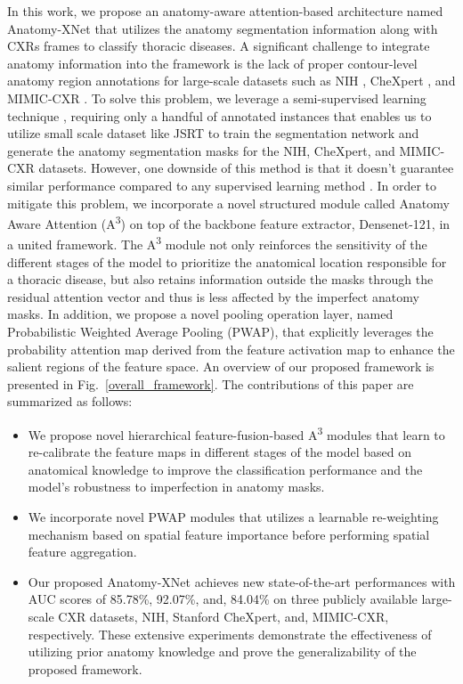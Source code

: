 \documentclass[journal]{IEEEtran}
\begin{document}
In this work, we propose an anatomy-aware attention-based architecture named Anatomy-XNet that utilizes the anatomy segmentation information along with CXRs frames to classify thoracic diseases. A significant challenge to integrate anatomy information into the framework is the lack of proper contour-level anatomy region annotations for large-scale datasets such as NIH \cite{8099852}, CheXpert \cite{irvin2019chexpert}, and MIMIC-CXR \cite{johnson2019mimiccxrjpg}. To solve this problem, we leverage a semi-supervised learning technique \cite{Mondal2019RevisitingCF}, requiring only a handful of annotated instances that enables us to utilize small scale dataset like JSRT \cite{Shiraishi2000DevelopmentOA} to train the segmentation network and generate the anatomy segmentation masks for the NIH, CheXpert, and MIMIC-CXR datasets. However, one downside of this method is that it doesn't guarantee similar performance compared to any supervised learning method \cite{Mondal2019RevisitingCF}. In order to mitigate this problem, we incorporate a novel structured module called Anatomy Aware Attention (A\textsuperscript{3}) on top of the backbone feature extractor, Densenet-121, in a united framework. The A\textsuperscript{3} module not only reinforces the sensitivity of the different stages of the model to prioritize the anatomical location responsible for a thoracic disease, but also retains information outside the masks through the residual attention vector and thus is less affected by the imperfect anatomy masks. In addition, we propose a novel pooling operation layer, named Probabilistic Weighted Average Pooling (PWAP), that explicitly leverages the probability attention map derived from the feature activation map to enhance the salient regions of the feature space. An overview of our proposed framework is presented in Fig.~\ref{overall_framework}. The contributions of this paper are summarized as follows:
\begin{itemize}
  \item We propose novel hierarchical feature-fusion-based A\textsuperscript{3} modules that learn to re-calibrate the feature maps in different stages of the model based on anatomical knowledge to improve the classification performance and the model's robustness to imperfection in anatomy masks.
  \item We incorporate novel PWAP modules that utilizes a learnable re-weighting mechanism based on spatial feature importance before performing spatial feature aggregation.
  \item Our proposed Anatomy-XNet achieves new state-of-the-art performances with AUC scores of 85.78\%, 92.07\%, and, 84.04\% on three publicly available large-scale CXR datasets, NIH, Stanford CheXpert, and, MIMIC-CXR, respectively. These extensive experiments demonstrate the effectiveness of utilizing prior anatomy knowledge and prove the generalizability of the proposed framework.
\end{itemize}
\end{document}
